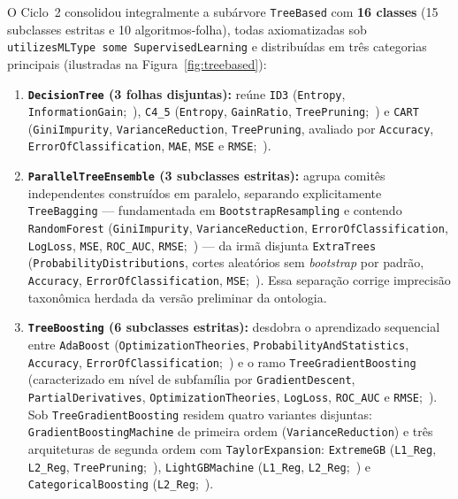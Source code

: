\documentclass[11pt,a4paper]{article}
\newcommand{\onto}[1]{\texttt{#1}}
\begin{document}
O Ciclo~2 consolidou integralmente a subárvore \onto{TreeBased} com \textbf{16 classes} (15 subclasses estritas e 10 algoritmos-folha), todas axiomatizadas sob \onto{utilizesMLType some SupervisedLearning} e distribuídas em três categorias principais (ilustradas na Figura~\ref{fig:treebased}):
\begin{enumerate}[leftmargin=*,nosep]
  \item \textbf{\onto{DecisionTree} (3 folhas disjuntas):} reúne \onto{ID3} (\onto{Entropy}, \onto{InformationGain};~\cite{quinlan1993c45,sarker2021ml}), \onto{C4\_5} (\onto{Entropy}, \onto{GainRatio}, \onto{TreePruning};~\cite{quinlan1993c45}) e \onto{CART} (\onto{GiniImpurity}, \onto{VarianceReduction}, \onto{TreePruning}, avaliado por \onto{Accuracy}, \onto{ErrorOfClassification}, \onto{MAE}, \onto{MSE} e \onto{RMSE};~\cite{breiman1984cart,elmassari2022diabetes}).
  \item \textbf{\onto{ParallelTreeEnsemble} (3 subclasses estritas):} agrupa comitês independentes construídos em paralelo, separando explicitamente \onto{TreeBagging} --- fundamentada em \onto{BootstrapResampling} e contendo \onto{RandomForest} (\onto{GiniImpurity}, \onto{VarianceReduction}, \onto{ErrorOfClassification}, \onto{LogLoss}, \onto{MSE}, \onto{ROC\_AUC}, \onto{RMSE};~\cite{breiman2001random,bentejac2021comparative}) --- da irmã disjunta \onto{ExtraTrees} (\onto{ProbabilityDistributions}, cortes aleatórios sem \emph{bootstrap} por padrão, \onto{Accuracy}, \onto{ErrorOfClassification}, \onto{MSE};~\cite{geurts2006extremely}). Essa separação corrige imprecisão taxonômica herdada da versão preliminar da ontologia.
  \item \textbf{\onto{TreeBoosting} (6 subclasses estritas):} desdobra o aprendizado sequencial entre \onto{AdaBoost} (\onto{OptimizationTheories}, \onto{ProbabilityAndStatistics}, \onto{Accuracy}, \onto{ErrorOfClassification};~\cite{freund1997decision}) e o ramo \onto{TreeGradientBoosting} (caracterizado em nível de subfamília por \onto{GradientDescent}, \onto{PartialDerivatives}, \onto{OptimizationTheories}, \onto{LogLoss}, \onto{ROC\_AUC} e \onto{RMSE};~\cite{bentejac2021comparative}). Sob \onto{TreeGradientBoosting} residem quatro variantes disjuntas: \onto{GradientBoostingMachine} de primeira ordem (\onto{VarianceReduction}) e três arquiteturas de segunda ordem com \onto{TaylorExpansion}: \onto{ExtremeGB} (\onto{L1\_Reg}, \onto{L2\_Reg}, \onto{TreePruning};~\cite{bentejac2021comparative,sarker2021ml}), \onto{LightGBMachine} (\onto{L1\_Reg}, \onto{L2\_Reg};~\cite{bentejac2021comparative}) e \onto{CategoricalBoosting} (\onto{L2\_Reg};~\cite{bentejac2021comparative}).
\end{enumerate}
\end{document}
